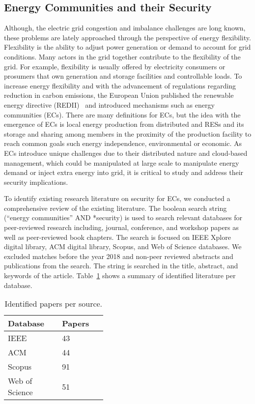 \subsection{Energy Communities and their Security}

Although, the electric grid congestion and imbalance challenges are long known, these problems are lately approached through the perspective of energy flexibility. Flexibility is the ability to adjust power generation or demand to account for grid conditions. Many actors in the grid together contribute to the flexibility of the grid. For example, flexibility is usually offered by electricity consumers or prosumers that own generation and storage facilities and controllable loads. To increase energy flexibility and with the advancement of regulations regarding  reduction in carbon emissions, the European Union published the renewable energy directive (REDII)~\cite{ec-eu} and introduced mechanisms such as energy communities (ECs). There are many definitions for ECs, but the idea with the emergence of ECs is local energy production from distributed and RESs and its storage and sharing among members in the proximity of the production facility to reach common goals such energy independence, environmental or economic. As ECs introduce unique challenges due to their distributed nature and cloud-based management, which could be manipulated at large scale to manipulate energy demand or inject extra energy into grid, it is critical to study and address their security implications. 

To identify existing research literature on security for ECs, we conducted a comprehensive review of the existing literature. The boolean search string (``energy communities” AND *security) is used to search relevant databases for peer-reviewed research including, journal, conference, and workshop papers as well as peer-reviewed book chapters. The search is focused on IEEE Xplore digital library, ACM digital library, Scopus, and Web of Science databases. We excluded matches before the year 2018 and non-peer reviewed abstracts and publications from the search. The string is searched in the title, abstract, and keywords of the article. Table~\ref{tab:papers} shows a summary of identified literature per database. 

\begin{table}[htbp!] 
\centering
\caption{Identified papers per source.}
\begin{tabular}{| p{0.2\linewidth} | p{0.2\linewidth} |}
\hline
\textbf{Database} & \textbf{Papers} 
\\ \hline
IEEE & 43 \\ \hline
ACM & 44 \\ \hline
Scopus & 91 \\ \hline
Web of Science & 51 \\ \hline
\end{tabular}
\centering
\label{tab:papers}
\end{table}


